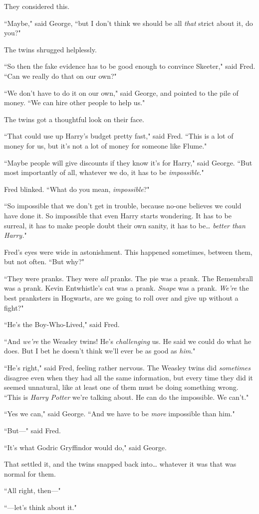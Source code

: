 They considered this.

``Maybe," said George, ``but I don't think we should be all \emph{that} strict about it, do you?"

The twins shrugged helplessly.

``So then the fake evidence has to be good enough to convince Skeeter," said Fred. ``Can we really do that on our own?"

``We don't have to do it on our own," said George, and pointed to the pile of money. ``We can hire other people to help us."

The twins got a thoughtful look on their face.

``That could use up Harry's budget pretty fast," said Fred. ``This is a lot of money for us, but it's not a lot of money for someone like Flume."

``Maybe people will give discounts if they know it's for Harry," said George. ``But most importantly of all, whatever we do, it has to be \emph{impossible}."

Fred blinked. ``What do you mean, \emph{impossible}?"

``So impossible that we don't get in trouble, because no-one believes we could have done it. So impossible that even Harry starts wondering. It has to be surreal, it has to make people doubt their own sanity, it has to be{\ldots} \emph{better than Harry.}"

Fred's eyes were wide in astonishment. This happened sometimes, between them, but not often. ``But why?"

``They were pranks. They were \emph{all} pranks. The pie was a prank. The Remembrall was a prank. Kevin Entwhistle's cat was a prank. \emph{Snape} was a prank. \emph{We're} the best pranksters in Hogwarts, are we going to roll over and give up without a fight?"

``He's the Boy-Who-Lived," said Fred.

``And \emph{we're} the Weasley twins! He's \emph{challenging} us. He said we could do what he does. But I bet he doesn't think we'll ever be as good as \emph{him}."

``He's right," said Fred, feeling rather nervous. The Weasley twins did \emph{sometimes} disagree even when they had all the same information, but every time they did it seemed unnatural, like at least one of them must be doing something wrong. ``This is \emph{Harry Potter} we're talking about. He can do the impossible. We can't."

``Yes we can," said George. ``And we have to be \emph{more} impossible than him."

``But—" said Fred.

``It's what Godric Gryffindor would do," said George.

That settled it, and the twins snapped back into{\ldots} whatever it was that was normal for them.

``All right, then—"

``—let's think about it."

